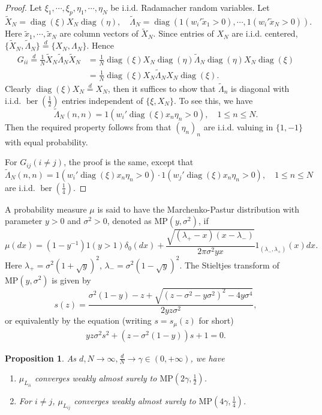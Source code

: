 \documentclass{article}
\newcommand{\diag}{\operatorname{diag}}
\newcommand{\tX}{\tilde{X}}
\newcommand{\tx}{\tilde{x}}
\newcommand{\tL}{\tilde{\Lambda}}
\newcommand{\wt}{\widetilde}
\newcommand{\rw}{\rightarrow}
\newcommand{\1}{^{(1)}}
\newcommand{\2}{^{(2)}}
\newtheorem{prop}{Proposition}
\newcommand{\bea}{\begin{equation}\begin{aligned}}
\newcommand{\eea}{\end{aligned}\end{equation}}
\begin{document}
\begin{proof}
Let $\xi_1,\cdots,\xi_p,\eta_1,\cdots,\eta_N$  be i.i.d. Radamacher random variables. Let
$$
\tX_N=\diag(\xi)X_N\diag(\eta),\quad \tL_N=\diag(1(w_i'\tx_1>0),\cdots,1(w_i'\tx_N>0)).
$$
Here $\wt{x}_1,\cdots,\wt{x}_N$ are column vectors of $\wt{X}_N$.
Since entries of $X_N$ are i.i.d. centered, $\{\tX_N,\tL_N\}\stackrel{d}{=}\{X_N,\Lambda_N\}$. Hence
\bea
G_{ii}\stackrel{d}{=}\frac{1}{N}\tX_N\tL_N\tX_N&=\frac{1}{N}\diag(\xi)X_N\diag(\eta)\tL_N\diag(\eta)X_N\diag(\xi)\\
&=\frac{1}{N}\diag(\xi)X_N\tL_NX_N\diag(\xi).
\eea
Clearly $\diag(\xi)X_N\stackrel{d}{=}X_N$, then it suffices to show that $\tL_n$ is diagonal with i.i.d. $\operatorname{ber}(\frac{1}{2})$ entries independent of $\{\xi,X_N\}$. To see this, we have
$$
\tL_N(n,n)=1(w_i'\diag(\xi)x_n\eta_n>0),\quad 1\leq n\leq N.
$$
Then the required property follows from that $(\eta_n)_n$ are i.i.d. valuing in $\{1,-1\}$ with equal probability.



For $G_{ij} (i\ne j)$, the proof is the same, except that
$$
\tL_N(n,n)=1(w_i'\diag(\xi)x_n\eta_n>0)\cdot1( w_j'\diag(\xi)x_n\eta_n>0),\quad 1\leq n\leq N
$$
are i.i.d. $\operatorname{ber}(\frac{1}{4})$. 
\end{proof}

A probability measure $\mu$ is said to have the Marchenko-Pastur distribution with parameter $y>0$ and $\sigma^2>0$, denoted as $\text{MP}(y,\sigma^2)$, if
$$
\mu(dx)=(1-y^{-1})1(y>1)\delta_0(dx)+\frac
{\sqrt{(\lambda_+-x)(x-\lambda_-)}}{2\pi\sigma^2y x}1_{(\lambda_-,\lambda_+)}(x)dx.
$$
Here $\lambda_+=\sigma^2(1+\sqrt{y})^2$, $\lambda_-=\sigma^2(1-\sqrt{y})^2$.
The Stieltjes transform of $\text{MP}(y,\sigma^2)$ is given by
$$
s(z)=\frac{\sigma^2(1-y)-z+\sqrt{(z-\sigma^2-y\sigma^2)^2-4y\sigma^4}}{2yz\sigma^2},
$$
or equivalently by the equation (writing $s=s_{\mu}(z)$ for short)
\bea\label{MPs2}
yz\sigma^2 s^2+(z-\sigma^2(1-y))s+1=0.
\eea

\begin{prop}\label{NN_MSE_MP}
     As $d,N\rw\infty, \frac
    {d}{N}\rw \gamma\in (0,+\infty)$, we have
    \begin{enumerate}
        \item $\mu_{L_{ii}}$ converges weakly almost surely to $\text{MP}(2\gamma,\frac{1}{2})$.
        \item For $i\ne j$, $\mu_{L_{ij}}$ converges weakly almost surely to $\text{MP}(4\gamma,\frac{1}{4})$.
    \end{enumerate}
\end{prop}
\end{document}
